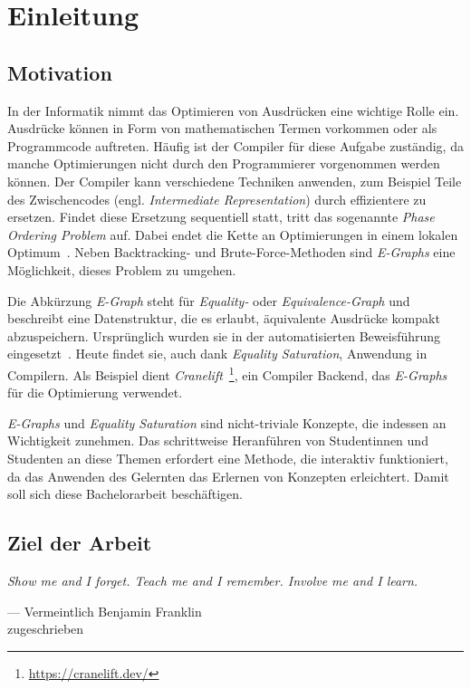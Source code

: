 \section{Einleitung}\label{sec:einleitung}

\subsection{Motivation}

\noindent In der Informatik nimmt das Optimieren von Ausdrücken eine wichtige Rolle ein. 
Ausdrücke können in Form von mathematischen Termen vorkommen oder als Programmcode auftreten.
Häufig ist der Compiler für diese Aufgabe zuständig, da manche Optimierungen nicht durch den Programmierer vorgenommen werden können. 
Der Compiler kann verschiedene Techniken anwenden, zum Beispiel Teile des Zwischencodes (engl. \textit{Intermediate Representation}) durch effizientere zu ersetzen.
Findet diese Ersetzung sequentiell statt, tritt das sogenannte \textit{Phase Ordering Problem} auf. Dabei endet die Kette an Optimierungen in einem lokalen Optimum~\cite{phaseorder-2009}.
Neben Backtracking- und Brute-Force-Methoden sind \textit{E-Graphs} eine Möglichkeit, dieses Problem zu umgehen. 

\noindent Die Abkürzung \textit{E-Graph} steht für \textit{Equality-} oder \textit{Equivalence-Graph} und beschreibt eine Datenstruktur, die es
erlaubt, äquivalente Ausdrücke kompakt abzuspeichern.
Ursprünglich wurden sie in der automatisierten Beweisführung eingesetzt~\cite{2021-egg}. Heute findet sie, auch dank \textit{Equality Saturation}, Anwendung in Compilern.
Als Beispiel dient \textit{Cranelift}~\footnote{\hspace{1.5mm}\url{https://cranelift.dev/}}, ein Compiler Backend, das \textit{E-Graphs} für die Optimierung verwendet.

\noindent \textit{E-Graphs} und \textit{Equality Saturation} sind nicht-triviale Konzepte, die indessen an Wichtigkeit zunehmen. 
Das schrittweise Heranführen von Studentinnen und Studenten an diese Themen erfordert eine Methode, die interaktiv funktioniert, da das Anwenden des Gelernten 
das Erlernen von Konzepten erleichtert. Damit soll sich diese Bachelorarbeit beschäftigen. 

\subsection{Ziel der Arbeit}

\vspace{5mm}
\begin{center}
    {\itshape
    \rmfamily
    \glqq Show me and I forget.
    Teach me and I remember. 
    Involve me and I learn.\grqq}
    \vspace{-3mm}
    \begin{flushright}
        \footnotesize
        --- Vermeintlich 
        Benjamin Franklin \\
        zugeschrieben
    \end{flushright}
\end{center}\vspace{3mm}

